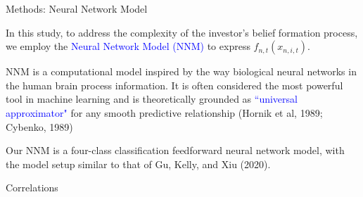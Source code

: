 \documentclass[11pt, aspectratio=169]{beamer}
\newenvironment{wideitemize}{\itemize\addtolength{\itemsep}{10pt}}{\enditemize}
\begin{document}
\begin{frame}{Methods: Neural Network Model}
    \bigskip
    \begin{wideitemize}
    \item In this study, to address the complexity of the investor's belief formation process, we employ the \textcolor{blue}{Neural Network Model (NNM)} to express $f_{n,t}(x_{n,i,t})$.
    \item NNM is a computational model inspired by the way \alert{biological neural networks} in the human brain process information. It is often considered the most powerful tool in machine learning and is theoretically grounded as \textcolor{blue}{``universal approximator"} for any smooth predictive relationship (Hornik et al, 1989; Cybenko, 1989)
    \item Our NNM is a \alert{four-class classification feedforward neural network model}, with the model setup similar to that of Gu, Kelly, and Xiu (2020). 
    \end{wideitemize}
\end{frame}





 \begin{frame}{Correlations}
 
\end{frame}
\end{document}
